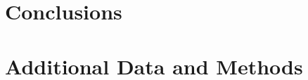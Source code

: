 \documentclass[12pt]{book}
\begin{document}
\chapter{Conclusions}
\label{chap:conclusions}


\appendix
\chapter{Additional Data and Methods}
\label{chap:appendix}



% 
\printbibliography
{}

\begin{appendices}%
\appendixheaderon
\label{part:annexe}

\end{appendices}
\end{document}
